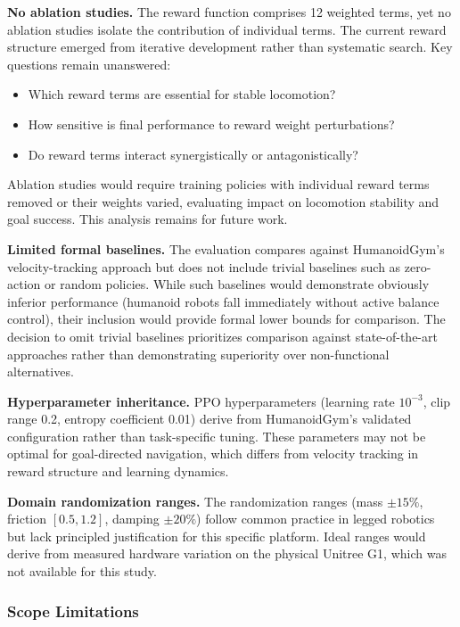 \documentclass[12pt,a4paper]{article}
\begin{document}
\textbf{No ablation studies.} The reward function comprises 12 weighted terms, yet no ablation studies isolate the contribution of individual terms. The current reward structure emerged from iterative development rather than systematic search. Key questions remain unanswered:
\begin{itemize}
    \item Which reward terms are essential for stable locomotion?
    \item How sensitive is final performance to reward weight perturbations?
    \item Do reward terms interact synergistically or antagonistically?
\end{itemize}
Ablation studies would require training policies with individual reward terms removed or their weights varied, evaluating impact on locomotion stability and goal success. This analysis remains for future work.

\textbf{Limited formal baselines.} The evaluation compares against HumanoidGym's velocity-tracking approach but does not include trivial baselines such as zero-action or random policies. While such baselines would demonstrate obviously inferior performance (humanoid robots fall immediately without active balance control), their inclusion would provide formal lower bounds for comparison. The decision to omit trivial baselines prioritizes comparison against state-of-the-art approaches rather than demonstrating superiority over non-functional alternatives.

\textbf{Hyperparameter inheritance.} PPO hyperparameters (learning rate $10^{-3}$, clip range 0.2, entropy coefficient 0.01) derive from HumanoidGym's validated configuration rather than task-specific tuning. These parameters may not be optimal for goal-directed navigation, which differs from velocity tracking in reward structure and learning dynamics.

\textbf{Domain randomization ranges.} The randomization ranges (mass $\pm 15\%$, friction $[0.5, 1.2]$, damping $\pm 20\%$) follow common practice in legged robotics but lack principled justification for this specific platform. Ideal ranges would derive from measured hardware variation on the physical Unitree G1, which was not available for this study.

\subsubsection{Scope Limitations}
\end{document}
